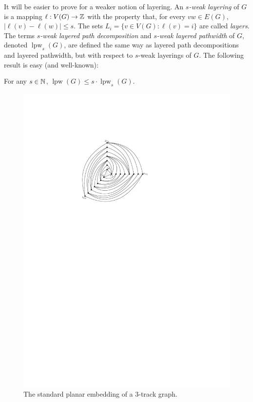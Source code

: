 \documentclass{patmorin}
\DeclareMathOperator{\lpw}{lpw}
\begin{document}
It will be easier to prove  for a weaker notion
of layering.  An \emph{$s$-weak layering} of $G$ is a mapping
$\ell:V(G)\to\mathbb{Z}$ with the property that, for every $vw\in E(G)$,
$|\ell(v)-\ell(w)|\le s$.  The sets $L_i=\{v\in V(G): \ell(v)=i\}$
are called \emph{layers}.  The terms \emph{$s$-weak layered path
decomposition} and \emph{$s$-weak layered pathwidth} of $G$, denoted
$\lpw_s(G)$, are defined the same way as layered path decompositions
and layered pathwidth, but with respect to $s$-weak layerings of $G$. The following result is easy (and well-known):

\begin{lem}
  For any $s\in\mathbb{N}$, $\lpw(G) \le s\cdot\lpw_s(G)$.
\end{lem}

\begin{figure}
  \begin{center}
     \includegraphics{figs/graph-1}
  \end{center}
  \caption{The standard planar embedding of a 3-track graph.}
\end{figure}
\end{document}
